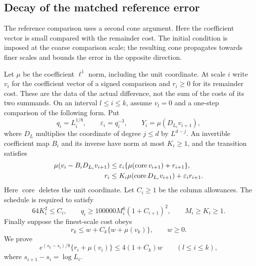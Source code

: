 \subsection{Decay of the matched reference error}
\label{sec:reference-cone}
The reference comparison uses a second cone argument. Here the
coefficient vector is small compared with the remainder cost.
The initial condition is imposed at the coarse comparison scale;
the resulting cone propagates towards finer scales and bounds
the error in the opposite direction.

Let $\mu$ be the coefficient $\ell^1$ norm, including the unit
coordinate. At scale $i$ write $v_i$ for the coefficient vector
of a signed comparison and $r_i\ge0$ for its remainder cost.
These are the data of the actual difference, not the sum of the
costs of its two summands. On an interval $l\le i\le k$, assume
$v_l=0$ and a one-step comparison of the following form. Put
\[
 q_i=L_i^{1/8},\qquad \varepsilon_i=q_i^{-3},\qquad
 Y_i=\mu(D_{L_i}v_{i+1}),
\]
where $D_L$ multiplies the coordinate of degree $j\le d$ by
$L^{d-j}$. An invertible coefficient map $B_i$ and its inverse
have norm at most $K_i\ge1$, and the transition satisfies
\begin{align}
 \mu(v_i-B_iD_{L_i}v_{i+1})
       &\le\varepsilon_i\{\mu(\operatorname{core}v_{i+1})+r_{i+1}\},
                                                        \label{eq:reference-direction}\\
 r_i&\le K_i\mu(\operatorname{core}D_{L_i}v_{i+1})
                                    +\varepsilon_i r_{i+1}.\notag
\end{align}
Here $\operatorname{core}$ deletes the unit coordinate. Let $C_i\ge1$
be the column allowances. The schedule is required to satisfy
\begin{equation}\label{eq:reference-bank}
 64K_i^2\le C_i,
 \qquad q_i\ge100000M_i^6(1+C_{i+1})^2,
 \qquad M_i\ge K_i\ge1.
\end{equation}
Finally suppose the finest-scale cost obeys
\begin{equation}\label{eq:reference-terminal}
                    r_k\le w+C_k\{w+\mu(v_k)\},\qquad w\ge0.
\end{equation}
We prove
\begin{equation}\label{eq:reference-gain}
 e^{(s_k-s_i)/8}\{r_i+\mu(v_i)\}
                    \le4(1+C_k)w\qquad(l\le i\le k),
\end{equation}
where $s_{i+1}-s_i=\log L_i$.


